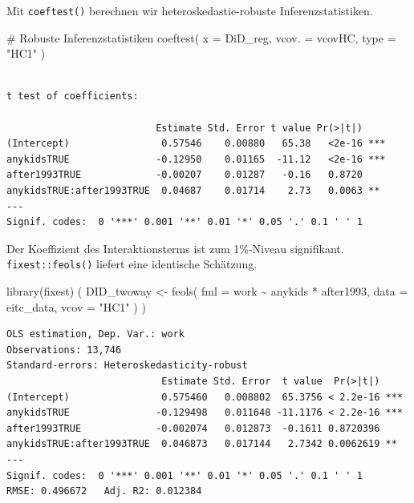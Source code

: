 \documentclass[
  a4paper,
  DIV=11,
  oneside]{scrreprt}
\newenvironment{Shaded}{\begin{snugshade}}{\end{snugshade}}
\newcommand{\AttributeTok}[1]{\textcolor[rgb]{0.40,0.45,0.13}{#1}}
\newcommand{\CommentTok}[1]{\textcolor[rgb]{0.37,0.37,0.37}{#1}}
\newcommand{\FunctionTok}[1]{\textcolor[rgb]{0.28,0.35,0.67}{#1}}
\newcommand{\NormalTok}[1]{\textcolor[rgb]{0.00,0.23,0.31}{#1}}
\newcommand{\OtherTok}[1]{\textcolor[rgb]{0.00,0.23,0.31}{#1}}
\newcommand{\SpecialCharTok}[1]{\textcolor[rgb]{0.37,0.37,0.37}{#1}}
\newcommand{\StringTok}[1]{\textcolor[rgb]{0.13,0.47,0.30}{#1}}
\begin{document}
Mit \texttt{coeftest()} berechnen wir heteroskedastie-robuste
Inferenzstatistiken.

\begin{Shaded}
\begin{Highlighting}[]
\CommentTok{\# Robuste Inferenzstatistiken}
\FunctionTok{coeftest}\NormalTok{(}
  \AttributeTok{x =}\NormalTok{ DiD\_reg, }
  \AttributeTok{vcov. =}\NormalTok{ vcovHC, }
  \AttributeTok{type =} \StringTok{"HC1"}
\NormalTok{)}
\end{Highlighting}
\end{Shaded}

\begin{verbatim}

t test of coefficients:

                          Estimate Std. Error t value Pr(>|t|)    
(Intercept)                0.57546    0.00880   65.38   <2e-16 ***
anykidsTRUE               -0.12950    0.01165  -11.12   <2e-16 ***
after1993TRUE             -0.00207    0.01287   -0.16   0.8720    
anykidsTRUE:after1993TRUE  0.04687    0.01714    2.73   0.0063 ** 
---
Signif. codes:  0 '***' 0.001 '**' 0.01 '*' 0.05 '.' 0.1 ' ' 1
\end{verbatim}

Der Koeffizient des Interaktionsterms ist zum 1\%-Niveau signifikant.
\texttt{fixest::feols()} liefert eine identische Schätzung.

\begin{Shaded}
\begin{Highlighting}[]
\FunctionTok{library}\NormalTok{(fixest)}
\NormalTok{(}
\NormalTok{  DID\_twoway }\OtherTok{\textless{}{-}} \FunctionTok{feols}\NormalTok{(}
    \AttributeTok{fml =}\NormalTok{ work }\SpecialCharTok{\textasciitilde{}}\NormalTok{ anykids }\SpecialCharTok{*}\NormalTok{ after1993,}
    \AttributeTok{data =}\NormalTok{ eitc\_data, }
    \AttributeTok{vcov =} \StringTok{"HC1"}
\NormalTok{  )}
\NormalTok{)}
\end{Highlighting}
\end{Shaded}

\begin{verbatim}
OLS estimation, Dep. Var.: work
Observations: 13,746
Standard-errors: Heteroskedasticity-robust 
                           Estimate Std. Error  t value  Pr(>|t|)    
(Intercept)                0.575460   0.008802  65.3756 < 2.2e-16 ***
anykidsTRUE               -0.129498   0.011648 -11.1176 < 2.2e-16 ***
after1993TRUE             -0.002074   0.012873  -0.1611 0.8720396    
anykidsTRUE:after1993TRUE  0.046873   0.017144   2.7342 0.0062619 ** 
---
Signif. codes:  0 '***' 0.001 '**' 0.01 '*' 0.05 '.' 0.1 ' ' 1
RMSE: 0.496672   Adj. R2: 0.012384
\end{verbatim}
\end{document}
